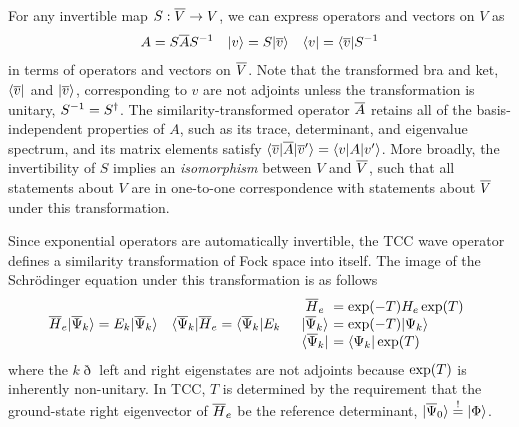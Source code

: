 \documentclass[11pt]{article}
\numberwithin{equation}{section}
\begin{document}
\begin{dfn}
For any invertible map $S:\overline{V}\rightarrow V$, we can express operators and vectors on $V$ as
\begin{align}
  A
=
  S
  \overline{A}
  S^{-1}
&&
  |v\rangle
=
  S
  |\overline{v}\rangle
&&
  \langle v|
=
  \langle\overline{v}|
  S^{-1}
\end{align}
in terms of operators and vectors on $\overline{V}$.
Note that the transformed bra and ket, $\langle\overline{v}|$ and $|\overline{v}\rangle$, corresponding to $v$ are not adjoints unless the transformation is unitary, $S^{-1}=S^\dagger$.
The similarity-transformed operator $\overline{A}$ retains all of the basis-independent properties of $A$, such as its trace, determinant, and eigenvalue spectrum, and its matrix elements satisfy $\langle\overline{v}|\overline{A}|\overline{v}'\rangle=\langle v|A|v'\rangle$.
More broadly, the invertibility of $S$ implies an \textit{isomorphism} between $V$ and $\overline{V}$, such that all statements about $V$ are in one-to-one correspondence with statements about $\overline{V}$ under this transformation.
\end{dfn}


\begin{rmk}
Since exponential operators are automatically invertible, the TCC wave operator defines a similarity transformation of Fock space into itself.
The image of the Schr\"odinger equation under this transformation is as follows
\begin{align}
\label{eq:similarity-transformed-schrodinger-equation}
  \ol{H}_e
  \kt{\ol{\Y}_k}
=
  E_k
  \kt{\ol{\Y}_k}
&&
  \br{\ol{\Y}_k}
  \ol{H}_e
=
  \br{\ol{\Y}_k}
  E_k
&&
\begin{array}{c@{\ }l}
  \ol{H}_e
&=
  \mr{exp}(-T)
  H_e\,
  \mr{exp}(T)
\\
  \kt{\ol{\Y}_k}
&=
  \mr{exp}(-T)
  \kt{\Y_k}
\\
  \br{\ol{\Y}_k}
&=
  \br{\Y_k}\,
  \mr{exp}(T)
\end{array}
\end{align}
where the $k\eth$ left and right eigenstates are not adjoints because $\mathrm{exp}(T)$ is inherently non-unitary.
In TCC, $T$ is determined by the requirement that the ground-state right eigenvector of $\overline{H}_e$ be the reference determinant,
$
  |\overline{\Psi }_0\rangle
\overset{!}{=}
  |\Phi \rangle
$.
\end{rmk}
\end{document}

